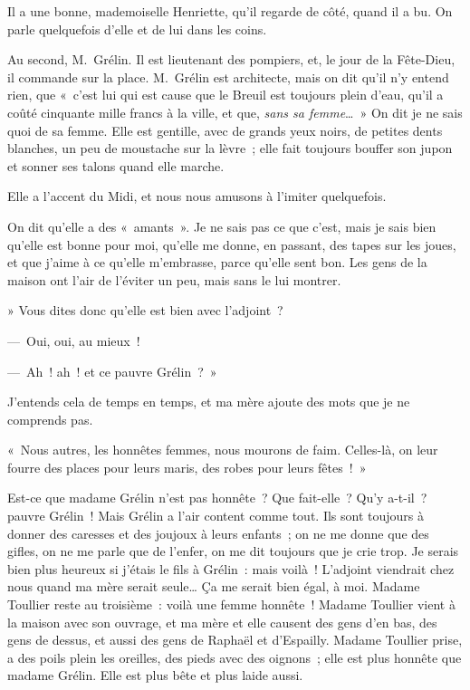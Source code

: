 \documentclass[french,twoside]{book} %
\begin{document}
Il a une bonne, mademoiselle Henriette, qu’il regarde de côté, quand il a bu. On parle quelquefois d’elle et de lui dans les coins.\par
Au second, M. Grélin. Il est lieutenant des pompiers, et, le jour de la Fête-Dieu, il commande sur la place. M. Grélin est architecte, mais on dit qu’il n’y entend rien, que « c’est lui qui est cause que le Breuil est toujours plein d’eau, qu’il a coûté cinquante mille francs à la ville, et que, \emph{sans sa femme}… » On dit je ne sais quoi de sa femme. Elle est gentille, avec de grands yeux noirs, de petites dents blanches, un peu de moustache sur la lèvre ; elle fait toujours bouffer son jupon et sonner ses talons quand elle marche.\par
Elle a l’accent du Midi, et nous nous amusons à l’imiter quelquefois.\par
On dit qu’elle a des « amants ». Je ne sais pas ce que c’est, mais je sais bien qu’elle est bonne pour moi, qu’elle me donne, en passant, des tapes sur les joues, et que j’aime à ce qu’elle m’embrasse, parce qu’elle sent bon. Les gens de la maison ont l’air de l’éviter un peu, mais sans le lui montrer.\par
» Vous dites donc qu’elle est bien avec l’adjoint ?\par
— Oui, oui, au mieux !\par
— Ah ! ah ! et ce pauvre Grélin ? »\par
J’entends cela de temps en temps, et ma mère ajoute des mots que je ne comprends pas.\par
« Nous autres, les honnêtes femmes, nous mourons de faim. Celles-là, on leur fourre des places pour leurs maris, des robes pour leurs fêtes ! »\par
Est-ce que madame Grélin n’est pas honnête ? Que fait-elle ? Qu’y a-t-il ? pauvre Grélin ! Mais Grélin a l’air content comme tout. Ils sont toujours à donner des caresses et des joujoux à leurs enfants ; on ne me donne que des gifles, on ne me parle que de l’enfer, on me dit toujours que je crie trop. Je serais bien plus heureux si j’étais le fils à Grélin : mais voilà ! L’adjoint viendrait chez nous quand ma mère serait seule… Ça me serait bien égal, à moi. Madame Toullier reste au troisième : voilà une femme honnête ! Madame Toullier vient à la maison avec son ouvrage, et ma mère et elle causent des gens d’en bas, des gens de dessus, et aussi des gens de Raphaël et d’Espailly. Madame Toullier prise, a des poils plein les oreilles, des pieds avec des oignons ; elle est plus honnête que madame Grélin. Elle est plus bête et plus laide aussi.\par
\end{document}
